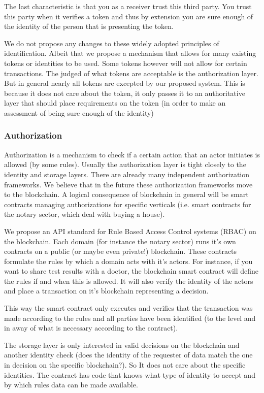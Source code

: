 \documentclass{article}
\begin{document}
The last characteristic is that you as a receiver trust this third party. You trust this party when it verifies a token and thus by extension you are sure enough of the identity of the person that is presenting the token. 

We do not propose any changes to these widely adopted principles of identification. Albeit that we propose a mechanism that allows for many existing tokens or identities to be used. Some tokens however will not allow for certain transactions. The judged of what tokens are acceptable is the authorization layer. But in general nearly all tokens are excepted by our proposed system. This is because it does not care about the token, it only passes it to an authoritative layer that should place requirements on the token (in order to make an assessment of being sure enough of the identity)

\subsubsection{Authorization}
Authorization is a mechanism to check if a certain action that an actor initiates is allowed (by some rules). Usually the authorization layer is tight closely to the identity and storage layers. There are already many independent authorization frameworks. We believe that in the future these authorization frameworks move to the blockchain. A logical consequence of blockchain in general will be smart contracts managing authorizations for specific verticals (i.e. smart contracts for the notary sector, which deal with buying a house).

We propose an API standard for Rule Based Access Control systems (RBAC) on the blockchain. Each domain (for instance the notary sector) runs it's own contracts on a public (or maybe even private!) blockchain. These contracts formulate the rules by which a domain acts with it's actors. For instance, if you want to share test results with a doctor, the blockchain smart contract will define the rules if and when this is allowed. It will also verify the identity of the actors and place a transaction on it's blockchain representing a decision.

This way the smart contract only executes and verifies that the transaction was made according to the rules and all parties have been identified (to the level and in away of what is necessary according to the contract).

The storage layer is only interested in valid decisions on the blockchain and another identity check (does the identity of the requester of data match the one in decision on the specific blockchain?). So It does not care about the specific identities. The contract has code that knows what type of identity to accept and by which rules data can be made available.
\end{document}
